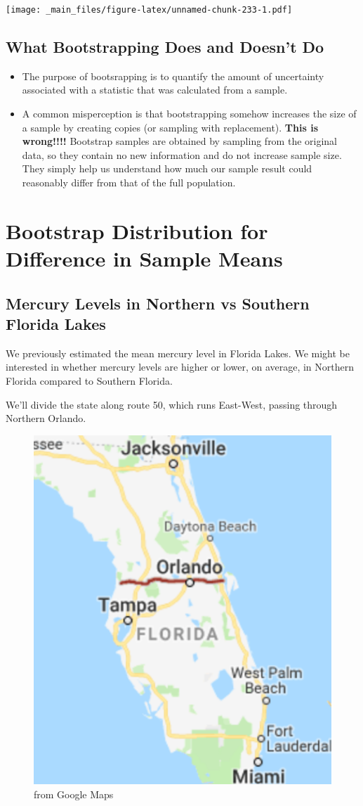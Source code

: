 \documentclass[]{book}
\begin{document}
\texttt{[image: \_main\_files/figure-latex/unnamed-chunk-233-1.pdf]}

\subsection{What Bootstrapping Does and Doesn't
Do}\label{what-bootstrapping-does-and-doesnt-do}

\begin{itemize}
\item
  The purpose of bootsrapping is to quantify the amount of uncertainty
  associated with a statistic that was calculated from a sample.
\item
  A common misperception is that bootstrapping somehow increases the
  size of a sample by creating copies (or sampling with replacement).
  \textbf{This is wrong!!!!} Bootstrap samples are obtained by sampling
  from the original data, so they contain no new information and do not
  increase sample size. They simply help us understand how much our
  sample result could reasonably differ from that of the full
  population.
\end{itemize}

\section{Bootstrap Distribution for Difference in Sample
Means}\label{bootstrap-distribution-for-difference-in-sample-means}

\subsection{Mercury Levels in Northern vs Southern Florida
Lakes}\label{mercury-levels-in-northern-vs-southern-florida-lakes}

We previously estimated the mean mercury level in Florida Lakes. We
might be interested in whether mercury levels are higher or lower, on
average, in Northern Florida compared to Southern Florida.

We'll divide the state along route 50, which runs East-West, passing
through Northern Orlando.

\begin{figure}
\includegraphics[width=0.3\linewidth]{Florida} \caption{from Google Maps}\label{fig:unnamed-chunk-234}
\end{figure}
\end{document}
